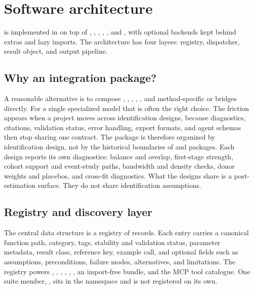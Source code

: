 \section{Software architecture}\label{sec:architecture}

\statspai{} is implemented in  on top of
 \citep{harris2020array}, 
\citep{virtanen2020scipy},  \citep{mckinney2010data},
 \citep{seabold2010statsmodels}, 
\citep{pedregosa2011scikit}, and 
\citep{sheppard2025linearmodels}, with optional backends kept behind
extras and lazy imports. The architecture has four layers: registry,
dispatcher, result object, and output pipeline.

\subsection{Why an integration package?}\label{sec:design-principles}\label{sec:why-integration}

A reasonable alternative is to compose ,
, , , , and
method-specific  or  bridges directly.
For a single specialized model that is often the right choice. The
friction appears when a project moves across identification designs,
because diagnostics, citations, validation status, error handling, export
formats, and agent schemas then stop sharing one contract. The package is
therefore organized by identification design, not by the historical
boundaries of  and  packages. Each design
reports its own diagnostics: balance and overlap, first-stage strength,
cohort support and event-study paths, bandwidth and density checks, donor
weights and placebos, and cross-fit diagnostics. What the designs share
is a post-estimation surface. They do not share identification
assumptions.

\subsection{Registry and discovery layer}\label{sec:registry}

The central data structure is a registry of 
records. Each entry carries a canonical function path, category, tags,
stability and validation status, parameter metadata, result class,
reference key, example call, and optional fields such as assumptions,
preconditions, failure modes, alternatives, and limitations. The registry
powers , ,
, ,
, , an import-free
 bundle, and the MCP tool catalogue. One suite member,
, sits in the  namespace and is not
registered on its own.

